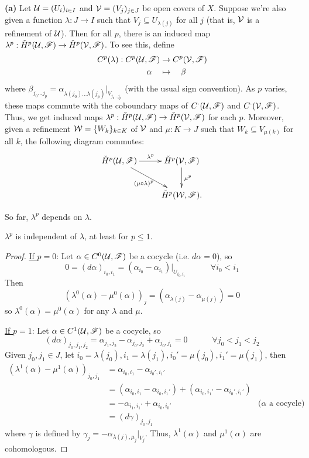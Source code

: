 {\bf (a)} Let $\mathcal{U}=(U_i)_{i\in I}$ and $\mathcal{V} = (V_j)_{j\in J}$ be
open covers of $X$.  Suppose we're also given a function
$\lambda:J\to I$ such that $V_j\subseteq U_{\lambda(j)}$ for all
$j$ (that is, $\mathcal{V}$ is a refinement of $\mathcal{U}$).  Then for all $p$,
there is an induced map $\lambda^p:\check H^p(\mathcal{U},\mathscr{F})\to \check
H^p(\mathcal{V},\mathscr{F})$.  To see this, define
\begin{align*}
 C^p(\lambda): C^p(\mathcal{U},\mathscr{F}) & \to C^p(\mathcal{V},\mathscr{F})\\
                    \alpha\quad &\mapsto\quad \beta
\end{align*}
where $\beta_{j_0\dots
j_p}=\alpha_{\lambda(j_0)\dots\lambda(j_p)}|_{V_{j_0\dots j_p}}$
(with the usual sign convention).  As $p$ varies, these maps
commute with the coboundary maps of $C^{\cdot}(\mathcal{U},\mathscr{F})$ and
$C^{\cdot}(\mathcal{V},\mathscr{F})$.  Thus, we get induced maps $\lambda^p:\check
H^p(\mathcal{U},\mathscr{F})\to \check H^p(\mathcal{V},\mathscr{F})$ for each $p$.  Moreover, given a
refinement $\mathcal{W} = \{W_k\}_{k\in K}$ of $\mathcal{V}$ and $\mu:K\to J$ such
that $W_k\subseteq V_{\mu(k)}$ for all $k$, the following diagram
commutes:
\[\xymatrix{
 \check H^p(\U,\F)\ar[r]^{\lambda^p}\ar[dr]_{(\mu\circ \lambda)^p}
 & \check H^p(\V,\F) \ar[d]^{\mu^p}\\
 & \check H^p(\W,\F).
}\]

So far, $\lambda^p$ depends on $\lambda$.
\begin{lemma*}
$\lambda^p$ is independent of $\lambda$, at least for $p\le 1$.
\end{lemma*}
\begin{proof}
 \underline{If $p=0$}: Let $\alpha\in C^0(\mathcal{U},\mathscr{F})$ be a cocycle (i.e.
 $d\alpha = 0$), so
 \[
    0 = (d\alpha)_{i_0,i_1} =
    (\alpha_{i_0}-\alpha_{i_1})|_{U_{i_0,i_1}} \qquad \quad \forall
    i_0<i_1
 \]
 Then
 \[
    (\lambda^0(\alpha)-\mu^0(\alpha))_j = (\alpha_{\lambda(j)} -
    \alpha_{\mu(j)}) = 0
 \] so $\lambda^0(\alpha) = \mu^0(\alpha)$ for any $\lambda$ and
 $\mu$.

 \underline{If $p=1$}: Let $\alpha \in C^1(\mathcal{U},\mathscr{F})$ be a cocycle, so
\[
    (d\alpha)_{j_0,j_1,j_2} = \alpha_{j_1,j_2} - \alpha_{j_0,j_2}
    + \alpha_{j_0,j_1} = 0 \qquad\quad \forall j_0<j_1<j_2
\]
 Given
 $j_0,j_1\in J$, let $i_0=\lambda(j_0), i_1=\lambda(j_1), i_0' =
 \mu(j_0), i_1' = \mu(j_1)$, then
 \begin{align*}
 (\lambda^1(\alpha)-\mu^1(\alpha))_{j_0,j_1} &=
 \alpha_{i_0,i_1}-\alpha_{i_0',i_1'} \\
    &= (\alpha_{i_0,i_1}-\alpha_{i_0,i_1'})
        +(\alpha_{i_0,i_1'}-\alpha_{i_0',i_1'})\\
    &= -\alpha_{i_1,i_1'} + \alpha_{i_0,i_0'} & \text{($\alpha$ a
    cocycle)}\\
    &= (d\gamma)_{j_0,j_1}
 \end{align*}
 where $\gamma$ is defined by $\gamma_j =
 -\alpha_{\lambda(j),\mu_j}|_{V_j}$.  Thus, $\lambda^1(\alpha)$ and
 $\mu^1(\alpha)$ are cohomologous.
\end{proof}


